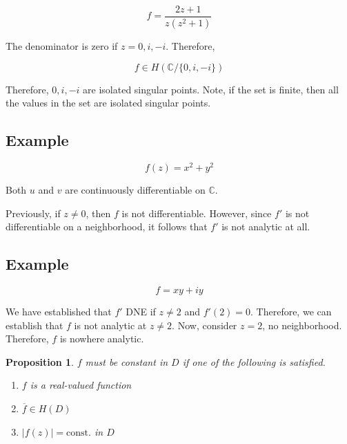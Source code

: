 \documentclass{article}
\newtheorem{proposition}[theorem]{Proposition}
\newtheorem{one minute paper}[theorem]{One Minute Paper}
\begin{document}
\begin{equation}
    f = \frac{2z + 1}{z(z^2 + 1)}
\end{equation}

The denominator is zero if $z = 0, i, -i$. Therefore, 

\begin{equation}
    f \in H(\mathbb{C}/\{0, i, -i\})
\end{equation}

Therefore, $0, i, -i$ are isolated singular points. Note, if the set is finite, then all the values in the set are isolated singular points. 

\subsection*{Example}

\begin{equation}
    f(z) = x^2 + y^2
\end{equation}

Both $u$ and $v$ are continuously differentiable on $\mathbb{C}$. 

Previously, if $z \neq 0$, then $f$ is not differentiable. However, since $f'$ is not differentiable on a neighborhood, it follows that $f'$ is not analytic at all. 

\subsection*{Example}

\begin{equation}
    f = xy + iy
\end{equation}

We have established that $f'$ DNE if $z \neq 2$ and $f'(2) = 0$. Therefore, we can establish that $f$ is not analytic at $z \neq 2$. Now, consider $z = 2$, no neighborhood. Therefore, $f$ is nowhere analytic. 

\begin{proposition}
    $f$ must be constant in $D$ if one of the following is satisfied. 
    \begin{enumerate}
        \item $f$ is a real-valued function 
        \item $\overline{f} \in H(D)$
        \item $|f(z)| = \text{const.}$ in $D$
    \end{enumerate}
\end{proposition}
\end{document}
